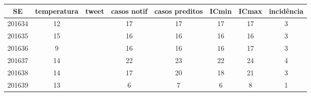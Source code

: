\begin{tabular}{c|ccccccc}
  \hline
SE & temperatura & tweet & casos notif & casos preditos & ICmin & ICmax & incidência \\ 
  \hline
201634 & 12 &  & 17 & 17 & 17 & 17 & 3 \\ 
  201635 & 15 &  & 16 & 16 & 16 & 16 & 3 \\ 
  201636 & 9 &  & 16 & 16 & 16 & 17 & 3 \\ 
  201637 & 14 &  & 22 & 23 & 22 & 24 & 4 \\ 
  201638 & 14 &  & 17 & 20 & 18 & 21 & 3 \\ 
  201639 & 13 &  & 6 & 7 & 6 & 8 & 1 \\ 
   \hline
\end{tabular}
